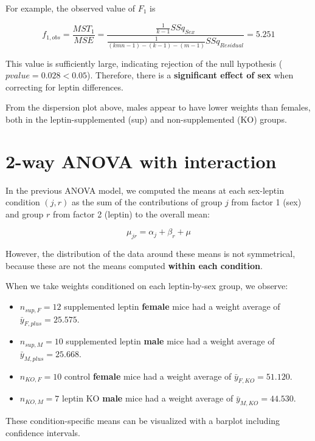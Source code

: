 \documentclass[
]{book}
\providecommand{\tightlist}{%
  \setlength{\itemsep}{0pt}\setlength{\parskip}{0pt}}
\begin{document}
For example, the observed value of \(F_1\) is

\[
f_{1,obs} = \frac{MST_1}{MSE} 
= \frac{\frac{1}{k-1} SSq_{Sex}}{\frac{1}{(kmn-1)-(k-1)-(m-1)} SSq_{Residual}} 
= 5.251
\]

This value is sufficiently large, indicating rejection of the null hypothesis (\(pvalue = 0.028 < 0.05\)). Therefore, there is a \textbf{significant effect of sex} when correcting for leptin differences.

From the dispersion plot above, males appear to have lower weights than females, both in the leptin-supplemented (sup) and non-supplemented (KO) groups.

\hypertarget{way-anova-with-interaction}{%
\section{2-way ANOVA with interaction}\label{way-anova-with-interaction}}

In the previous ANOVA model, we computed the means at each sex-leptin condition \((j,r)\) as the sum of the contributions of group \(j\) from factor 1 (sex) and group \(r\) from factor 2 (leptin) to the overall mean:

\[
\mu_{jr} = \alpha_{j} + \beta_{r} + \mu
\]

However, the distribution of the data around these means is not symmetrical, because these are not the means computed \textbf{within each condition}.

When we take weights conditioned on each leptin-by-sex group, we observe:

\begin{itemize}
\tightlist
\item
  \(n_{sup,F} = 12\) supplemented leptin \textbf{female} mice had a weight average of \(\bar{y}_{F,plus} = 25.575\).\\
\item
  \(n_{sup,M} = 10\) supplemented leptin \textbf{male} mice had a weight average of \(\bar{y}_{M,plus} = 25.668\).\\
\item
  \(n_{KO,F} = 10\) control \textbf{female} mice had a weight average of \(\bar{y}_{F,KO} = 51.120\).\\
\item
  \(n_{KO,M} = 7\) leptin KO \textbf{male} mice had a weight average of \(\bar{y}_{M,KO} = 44.530\).
\end{itemize}

These condition-specific means can be visualized with a barplot including confidence intervals.
\end{document}
